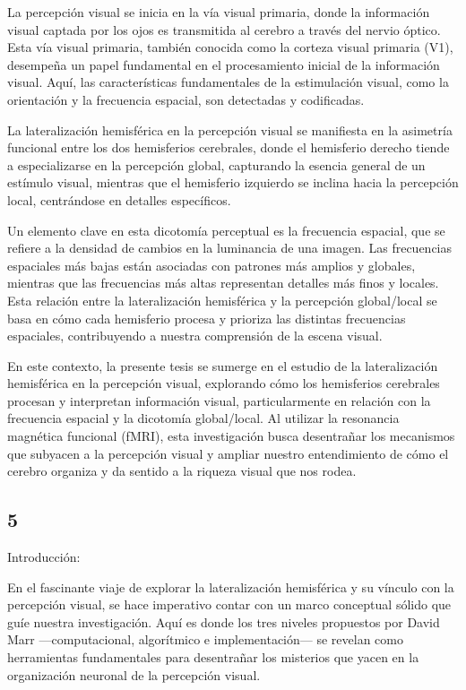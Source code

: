 \documentclass{article}
\begin{document}
	La percepción visual se inicia en la vía visual primaria, donde la información visual captada por los ojos es transmitida al cerebro a través del nervio óptico. Esta vía visual primaria, también conocida como la corteza visual primaria (V1), desempeña un papel fundamental en el procesamiento inicial de la información visual. Aquí, las características fundamentales de la estimulación visual, como la orientación y la frecuencia espacial, son detectadas y codificadas.
	
	La lateralización hemisférica en la percepción visual se manifiesta en la asimetría funcional entre los dos hemisferios cerebrales, donde el hemisferio derecho tiende a especializarse en la percepción global, capturando la esencia general de un estímulo visual, mientras que el hemisferio izquierdo se inclina hacia la percepción local, centrándose en detalles específicos.
	
	Un elemento clave en esta dicotomía perceptual es la frecuencia espacial, que se refiere a la densidad de cambios en la luminancia de una imagen. Las frecuencias espaciales más bajas están asociadas con patrones más amplios y globales, mientras que las frecuencias más altas representan detalles más finos y locales. Esta relación entre la lateralización hemisférica y la percepción global/local se basa en cómo cada hemisferio procesa y prioriza las distintas frecuencias espaciales, contribuyendo a nuestra comprensión de la escena visual.
	
	En este contexto, la presente tesis se sumerge en el estudio de la lateralización hemisférica en la percepción visual, explorando cómo los hemisferios cerebrales procesan y interpretan información visual, particularmente en relación con la frecuencia espacial y la dicotomía global/local. Al utilizar la resonancia magnética funcional (fMRI), esta investigación busca desentrañar los mecanismos que subyacen a la percepción visual y ampliar nuestro entendimiento de cómo el cerebro organiza y da sentido a la riqueza visual que nos rodea.
	
	\subsection{5}
	
	Introducción:
	
	En el fascinante viaje de explorar la lateralización hemisférica y su vínculo con la percepción visual, se hace imperativo contar con un marco conceptual sólido que guíe nuestra investigación. Aquí es donde los tres niveles propuestos por David Marr —computacional, algorítmico e implementación— se revelan como herramientas fundamentales para desentrañar los misterios que yacen en la organización neuronal de la percepción visual.
	
\end{document}
